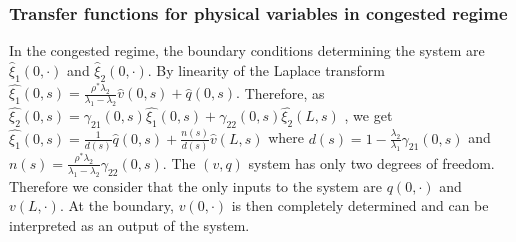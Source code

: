 \documentclass[letterpaper, 10 pt, conference]{ieeeconf}  %
\begin{document}
\subsubsection{Transfer functions for physical variables in congested regime}
In the congested regime, the boundary conditions determining the system are $\hat{\xi}_{1}\left(0,\cdot\right)$ and $\hat{\xi}_{2}\left(0,\cdot\right)$. By linearity of the Laplace transform
{\footnotesize
$\hat{\xi_{1}}\left(0,s\right) = 
\frac{
	\rho^{*}\lambda_{2}
}{
	\lambda_{1} - \lambda_{2}
} 
\hat{v}\left(0,s\right)
+
\hat{q}\left(0,s\right)
$.}
Therefore, as
{\footnotesize
$\hat{\xi_{2}}\left(0,s\right) =
\gamma_{21}\left(0,s\right)
\hat{\xi_{1}}\left(0,s\right)
+
\gamma_{22}\left(0,s\right)
\hat{\xi_{2}}\left(L,s\right)$}
, we get
{\footnotesize
$\hat{\xi_{1}}\left(0,s\right) =
\frac{1}{d\left(s\right)}
\hat{q}\left(0,s\right)
+
\frac{n\left(s\right)}{d\left(s\right)}
\hat{v}\left(L,s\right)
$}
where
{\footnotesize
$d\left(s\right) = 1 - \frac{\lambda_{2}}{\lambda_{1}}\gamma_{21}\left(0,s\right)$}
and
{\footnotesize$n\left(s\right) = \frac{\rho^{*} \lambda_{2}}{\lambda_{1} - \lambda_{2}} \gamma_{22}\left(0,s\right)$}. The $\left(v,q\right)$ system has only two degrees of freedom. Therefore we consider that the only inputs to the system are $q\left(0,\cdot\right)$ and $v\left(L,\cdot\right)$. At the boundary, $v\left(0,\cdot\right)$ is then completely determined and can be interpreted as an output of the system. 
\end{document}
